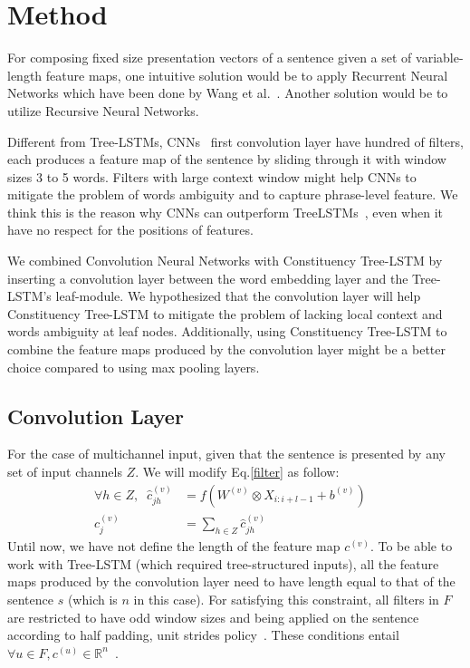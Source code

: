 \section{Method}
For composing fixed size presentation vectors of a sentence given a set of variable-length feature maps, one intuitive solution would be to apply Recurrent Neural Networks which have been done by Wang et al.~\cite{cnn-rnn}.
Another solution would be to utilize Recursive Neural Networks.

Different from Tree-LSTMs, CNNs~\cite{KimCNN,DCNN,2-layer-cnn} first convolution layer have hundred of filters, each produces a feature map of the sentence by sliding through it with window sizes 3 to 5 words.
Filters with large context window might help CNNs to mitigate the problem of words ambiguity and to capture phrase-level feature.
We think this is the reason why CNNs  can outperform TreeLSTMs~\cite{KimCNN,2-layer-cnn}, even when it have no respect for the positions of features. 

We combined Convolution Neural Networks with Constituency Tree-LSTM by inserting a convolution layer between the word embedding layer and the Tree-LSTM's leaf-module.
We hypothesized that the convolution layer will help Constituency Tree-LSTM to mitigate the problem of lacking local context and words ambiguity at leaf nodes.
Additionally, using Constituency Tree-LSTM to combine the feature maps produced by the convolution layer might be a better choice compared to using max pooling layers.
\subsection{Convolution Layer}
For the case of multichannel input, given that the sentence is presented by any set of input channels \(Z\).
We will modify Eq.\eqref{filter} as follow:
\begin{align}
\forall h \in Z, \; \; \hat{c}^{(v)}_{jh} &= f(W^{(v)} \otimes X_{i:i+l-1} + b^{(v)})& \\
c^{(v)}_j &= \sum_{h \in Z} \hat{c}^{(v)}_{jh}&
\end{align}
Until now, we have not define the length of the feature map \(c^{(v)}\). 
To be able to work with Tree-LSTM (which required tree-structured inputs), all the feature maps produced by the convolution layer need to have length equal to that of the sentence \(s\) (which is \(n\) in this case).
For satisfying this constraint, all filters in \(F\) are restricted to have odd window sizes and being applied on the sentence according to half padding, unit strides policy~\cite{conv-arith}.
These conditions entail \({\forall u \in F,  c^{(u)} \in \mathbb{R}^n}\)~\cite{conv-arith}.

